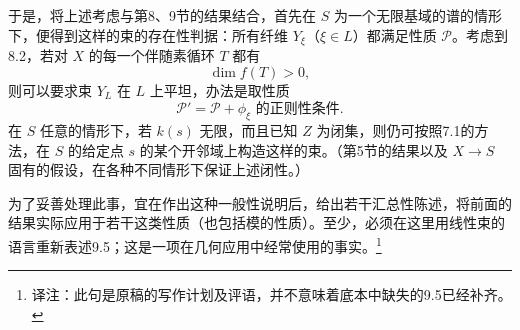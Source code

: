 \documentclass[openany]{ctexbook}
\newcommand{\note}[1]{\footnote{译注：#1}}
\begin{document}
于是，将上述考虑与第8、9节的结果结合，首先在 $S$ 为一个无限基域的谱的情形下，便得到这样的束的存在性判据：所有纤维 $Y_\xi$（$\xi\in L$）都满足性质 $\mathcal P$。考虑到8.2，若对 $X$ 的每一个伴随素循环 $T$ 都有
\[
\dim f(T)>0,
\]
则可以要求束 $Y_L$ 在 $L$ 上平坦，办法是取性质
\[
\mathcal P'=\mathcal P+\text{$\phi_\xi$ 的正则性条件}.
\]
在 $S$ 任意的情形下，若 $k(s)$ 无限，而且已知 $Z$ 为闭集，则仍可按照7.1的方法，在 $S$ 的给定点 $s$ 的某个开邻域上构造这样的束。（第5节的结果以及 $X\to S$ 固有的假设，在各种不同情形下保证上述闭性。）

为了妥善处理此事，宜在作出这种一般性说明后，给出若干汇总性陈述，将前面的结果实际应用于若干这类性质（也包括模的性质）。至少，必须在这里用线性束的语言重新表述9.5；这是一项在几何应用中经常使用的事实。\note{此句是原稿的写作计划及评语，并不意味着底本中缺失的9.5已经补齐。}
\end{document}
